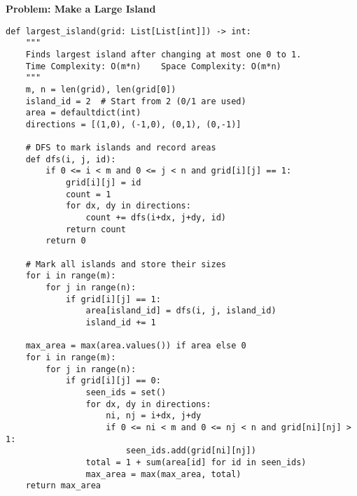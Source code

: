 \noindent\textbf{Problem: Make a Large Island}
\begin{verbatim}
def largest_island(grid: List[List[int]]) -> int:
    """
    Finds largest island after changing at most one 0 to 1.
    Time Complexity: O(m*n)    Space Complexity: O(m*n)
    """
    m, n = len(grid), len(grid[0])
    island_id = 2  # Start from 2 (0/1 are used)
    area = defaultdict(int)
    directions = [(1,0), (-1,0), (0,1), (0,-1)]
    
    # DFS to mark islands and record areas
    def dfs(i, j, id):
        if 0 <= i < m and 0 <= j < n and grid[i][j] == 1:
            grid[i][j] = id
            count = 1
            for dx, dy in directions:
                count += dfs(i+dx, j+dy, id)
            return count
        return 0
    
    # Mark all islands and store their sizes
    for i in range(m):
        for j in range(n):
            if grid[i][j] == 1:
                area[island_id] = dfs(i, j, island_id)
                island_id += 1
    
    max_area = max(area.values()) if area else 0
    for i in range(m):
        for j in range(n):
            if grid[i][j] == 0:
                seen_ids = set()
                for dx, dy in directions:
                    ni, nj = i+dx, j+dy
                    if 0 <= ni < m and 0 <= nj < n and grid[ni][nj] > 1:
                        seen_ids.add(grid[ni][nj])
                total = 1 + sum(area[id] for id in seen_ids)
                max_area = max(max_area, total)
    return max_area
\end{verbatim}

